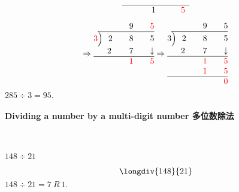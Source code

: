 \begin{solution}
$$\begin{array}{rccc}
\hline
&&\quad1\quad&\quad{\color{red} 5}
\end{array}
$$
$$
\arraycolsep=0pt
\Rightarrow
\begin{array}{rccc}
&&\quad 9\quad&\quad{\color{red} 5}\\
\cline{2-4}
{\color{red}3}&{\Big)}\ \ 2\quad&\quad8\quad&\quad5\\
&\quad2\quad&\quad7\quad&\quad\downarrow\\
\hline
&&\quad{\color{red}1}\quad&\quad{\color{red} 5}\\
&&&\\
&&&
\end{array}
\Rightarrow
\begin{array}{rccc}
&&\quad 9\quad&\quad5\\
\cline{2-4}
3&{\Big)}\ \ 2\quad&\quad8\quad&\quad5\\
&\quad2\quad&\quad7\quad&\quad\downarrow\\
\hline
&&\quad{\color{red}1}\quad&\quad{\color{red} 5}\\
&&\quad{\color{red} 1}\quad&\quad{\color{red} 5}\\ \hline
&&&\quad{\color{red} 0}
\end{array}
$$
$285\div 3= 95.$
\end{solution}

\paragraph{Dividing a number by a multi-digit number 多位数除法}
\ \  

\begin{example}
$148\div 21$
\end{example}
\begin{solution}

$$
\longdiv{148}{21}
$$
$148\div 21= 7\ R\  1.$
\end{solution}

   \newpage